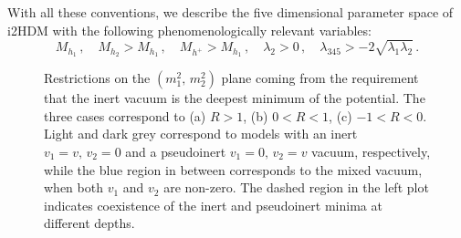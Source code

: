 \documentclass[12pt,a4paper]{article}
\begin{document}
With all these conventions, we describe the five dimensional parameter space of i2HDM
with the following phenomenologically relevant variables: 
\begin{equation}
\label{eq:model-parameters}
M_{h_1}\,,\quad M_{h_2} > M_{h_1}\,,\quad M_{h^+} > M_{h_1}\,, \quad \lambda_2 > 0\,,\quad \lambda_{345} > -2\sqrt{\lambda_1\lambda_2}\,.
\end{equation}

\begin{figure}[htb]
\caption{Restrictions on the $(m_1^2,\, m_2^2)$ plane coming from the requirement that
the inert vacuum is the deepest minimum of the potential. The three cases correspond to (a) $R > 1$,
(b) $0 < R < 1$, (c) $-1 < R < 0$. Light and dark grey correspond to models 
with an inert $v_1 = v,\, v_2 = 0$ and a pseudoinert $v_1 = 0,\, v_2 = v$ vacuum,
respectively, while the blue region in between corresponds to the mixed vacuum,
when both $v_1$ and $v_2$ are non-zero. The dashed region in the left plot indicates coexistence
of the inert and pseudoinert minima at different depths.}
\label{fig:parameter-space}
\end{figure}
\end{document}
